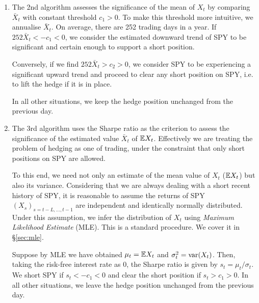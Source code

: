 \documentclass{article}
\begin{document}
\begin{enumerate}
\item The 2nd algorithm assesses the significance of the mean of $X_t$
  by comparing $\bar X_t$ with constant threshold $c_1 > 0$. To make this
  threshold more intuitive, we annualise $\bar X_t$. On average, there
  are 252 trading days in a year. If $252 \bar X_t < -c_1 < 0$, we
  consider the estimated downward trend of SPY to be significant and
  certain enough to support a short position.

  Conversely, if we find $252 \bar X_t > c_2 > 0$, we consider SPY to be
  experiencing a significant upward trend and proceed to clear any
  short position on SPY, i.e. to lift the hedge if it is in place.

  In all other situations, we keep the hedge position unchanged from
  the previous day.
  
\item The 3rd algorithm uses the Sharpe ratio as the criterion to
  assess the significance of the estimated value $\bar X_t$ of $\mathbb{E}
  X_t$. Effectively we are treating the problem of hedging as one of
  trading, under the constraint that only short positions on SPY are
  allowed.

  To this end, we need not only an estimate of the mean value of $X_t$
  ($\mathbb{E} X_t$) but also its variance. Considering that we are always
  dealing with a short recent history of SPY, it is reasonable to
  assume the returns of SPY $(X_s)_{s = t-L, \dots, t-1}$ are
  independent and identically normally distributed. Under this
  assumption, we infer the distribution of $X_t$ using {\it Maximum
    Likelihood Estimate} (MLE). This is a standard procedure. We cover
  it in \S\ref{sec:mle}.

  Suppose by MLE we have obtained $\mu_t = \mathbb{E} X_t$ and
  $\sigma_t^2 = \text{var}(X_t)$. Then, taking the risk-free interest rate
  as 0, the Sharpe ratio is given by $s_t = \mu_t/\sigma_t$. We short
  SPY if $s_t < -c_1 < 0$ and clear the short position if
  $s_t > c_1 > 0$. In all other situations, we leave the hedge
  position unchanged from the previous day.


\end{enumerate}
\end{document}
